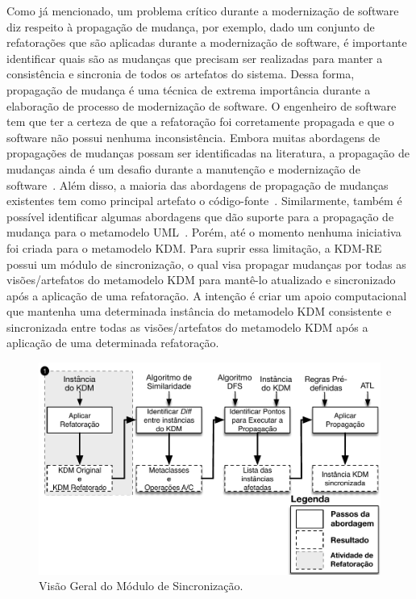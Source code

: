 Como já mencionado, um problema crítico durante a modernização de software diz respeito à propagação de mudança, por exemplo, dado um conjunto de refatorações que são aplicadas durante a modernização de software, é importante identificar quais são as mudanças que precisam ser realizadas para manter a consistência e sincronia de todos os artefatos do sistema. Dessa forma, propagação de mudança é uma técnica de extrema importância durante a elaboração de processo de modernização de software. O engenheiro de software tem que ter a certeza de que a refatoração foi corretamente propagada e que o software não possui nenhuma inconsistência. Embora muitas abordagens de propagações de mudanças possam ser identificadas na literatura, a propagação de mudanças ainda é um desafio durante a manutenção e modernização de software~\cite{Tom_2008_roadmap}. Além disso, a maioria das abordagens de propagação de mudanças existentes tem como principal artefato o código-fonte~\cite{Vaclav_methodology, Deursen07model_drivensoftware}. Similarmente, também é possível identificar algumas abordagens que dão suporte para a propagação de mudança para o metamodelo UML~\cite{Egyed_2008,Liu02rule, Briand_2006}. Porém, até o momento nenhuma iniciativa foi criada para o metamodelo KDM. Para suprir essa limitação, a KDM-RE possui um módulo de sincronização, o qual visa propagar mudanças por todas as visões/artefatos do metamodelo KDM para mantê-lo atualizado e sincronizado após a aplicação de uma refatoração. A intenção é criar um apoio computacional que mantenha uma determinada instância do metamodelo KDM consistente e sincronizada entre todas as visões/artefatos do metamodelo KDM após a aplicação de uma determinada refatoração. 

\begin{figure}[h]
	\centering
	\caption{Visão Geral do Módulo de Sincronização.}
	\label{fig:kdm_sinc}
	\includegraphics[scale=0.65]{images/AbordagemKDM_SInc}
	\fautor
\end{figure}


